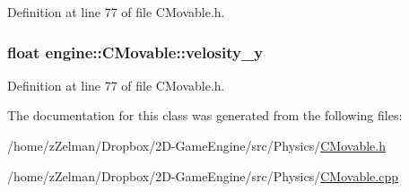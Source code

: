 Definition at line 77 of file C\-Movable.\-h.

\hypertarget{classengine_1_1CMovable_a7a1a4581926122ae31753261d1d35cf3}{
\subsubsection[{velosity\-\_\-y}]{\setlength{\rightskip}{0pt plus 5cm}float engine\-::\-C\-Movable\-::velosity\-\_\-y\hspace{0.3cm}{\ttfamily [protected]}}}\label{classengine_1_1CMovable_a7a1a4581926122ae31753261d1d35cf3}


Definition at line 77 of file C\-Movable.\-h.



The documentation for this class was generated from the following files\-:\begin{DoxyCompactItemize}
\item 
/home/z\-Zelman/\-Dropbox/2\-D-\/\-Game\-Engine/src/\-Physics/\hyperlink{CMovable_8h}{C\-Movable.\-h}\item 
/home/z\-Zelman/\-Dropbox/2\-D-\/\-Game\-Engine/src/\-Physics/\hyperlink{CMovable_8cpp}{C\-Movable.\-cpp}\end{DoxyCompactItemize}
